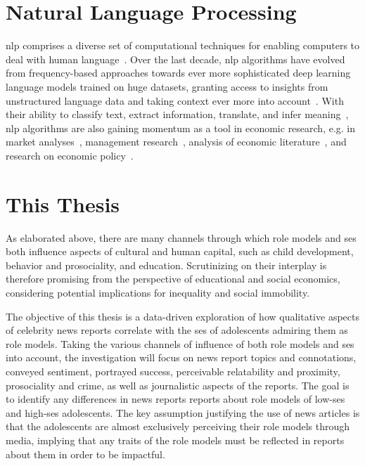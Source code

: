 \section{Natural Language Processing}\label{ch:nlp}
\gls{nlp} comprises a diverse set of computational techniques for enabling computers to deal with human language~\autocite{jurafsky_speech_2008}. Over the last decade, \gls{nlp} algorithms have evolved from frequency-based approaches towards ever more sophisticated deep learning language models trained on huge datasets, granting access to insights from unstructured language data and taking context ever more into account~\autocite{vajjala_practical_2020}. With their ability to classify text, extract information, translate, and infer meaning~\autocite{jurafsky_speech_2008}, \gls{nlp} algorithms are also gaining momentum as a tool in economic research, e.g. in market analyses~\autocite{hoberg_product_2010}, management research~\autocite{kang_natural_2020}, analysis of economic literature~\autocite{kim_keyword_2021,jelveh_detecting_2014,lambert_identifying_2021}, and research on economic policy~\autocite{elshehawy_sascat_2022}.


\section{This Thesis}\label{ch:this_thesis}
As elaborated above, there are many channels through which role models and \gls{ses} both influence aspects of cultural and human capital, such as child development, behavior and prosociality, and education. Scrutinizing on their interplay is therefore promising from the perspective of educational and social economics, considering potential implications for inequality and social immobility.

The objective of this thesis is a data-driven exploration of how qualitative aspects of celebrity news reports correlate with the \gls{ses} of adolescents admiring them as role models. Taking the various channels of influence of both role models and \gls{ses} into account, the investigation will focus on news report topics and connotations, conveyed sentiment, portrayed success, perceivable relatability and proximity, prosociality and crime, as well as journalistic aspects of the reports. The goal is to identify any differences in news reports reports about role models of low-\gls{ses} and high-\gls{ses} adolescents. The key assumption justifying the use of news articles is that the adolescents are almost exclusively perceiving their role models through media, implying that any traits of the role models must be reflected in reports about them in order to be impactful.

